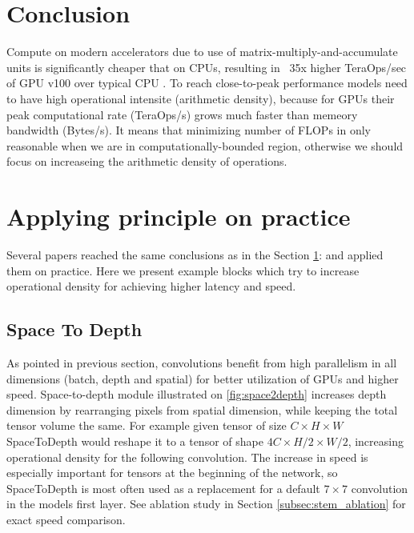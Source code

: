\section{Conclusion} \label{subsec: speed_conclusion}

Compute on modern accelerators due to use of matrix-multiply-and-accumulate units is significantly cheaper that on CPUs, resulting in ~35x higher TeraOps/sec of GPU v100 over typical CPU \cite{li2021_searching}. To reach close-to-peak performance models need to have high operational intensite (arithmetic density), because for GPUs their peak computational rate (TeraOps/s) grows much faster than memeory bandwidth (Bytes/s). It means that minimizing number of FLOPs in only reasonable when we are in computationally-bounded region, otherwise we should focus on increaseing the arithmetic density of operations.  


\section{Applying principle on practice}
Several papers reached the same conclusions as in the Section \ref{subsec: speed_conclusion}: \cite{li2021_searching} \cite{lin2020neural_genet} and applied them on practice. Here we present example blocks which try to increase operational density for achieving higher latency and speed. 


\subsection{Space To Depth} \label{subsec:space2depth}

As pointed in previous section, convolutions benefit from high parallelism in all dimensions (batch, depth and spatial) for better utilization of GPUs and higher speed. Space-to-depth module \cite{ridnik2021_tresnet} \cite{li2021_searching} illustrated on \ref{fig:space2depth} increases depth dimension by rearranging pixels from spatial dimension, while keeping the total tensor volume the same. For example given tensor of size $C \times H \times W$ SpaceToDepth would reshape it to a tensor of shape $4 C \times H / 2 \times W /2$, increasing operational density for the following convolution. The increase in speed is especially important for tensors at the beginning of the network, so SpaceToDepth is most often used as a replacement for a default $7 \times 7$ convolution in the models first layer. See ablation study in Section \ref{subsec:stem_ablation} for exact speed comparison.

